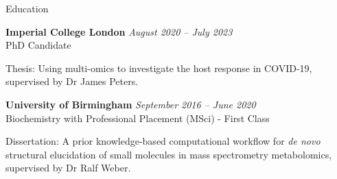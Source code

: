 \documentclass{resume}
\begin{document}

\begin{rSection}{Education}

\vspace{1pt plus 1pt}
{\bf Imperial College London} \hfill {\em August 2020 -- July 2023} 
\\ PhD Candidate
\item Thesis: Using multi-omics to investigate the host response in COVID-19, supervised by Dr James Peters.


{\bf University of Birmingham} \hfill {\em September 2016 -- June 2020} 
\\ Biochemistry with Professional Placement (MSci) - First Class
\item Dissertation: A prior knowledge-based computational workflow for \textit{de novo} structural elucidation of small molecules in mass spectrometry metabolomics, supervised by Dr Ralf Weber.

\end{rSection}
\end{document}
